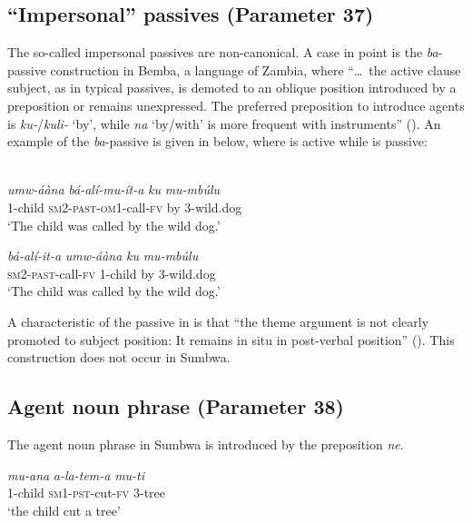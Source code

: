 \documentclass[output=paper		  ]{langscibook}
\begin{document}
\subsection{``Impersonal'' passives (Parameter 37)}\label{sec:kahigi:4.2}

{The so-called impersonal passives are non-canonical. A case in point is the} {\textit{ba}}{{}-passive construction in Bemba, a language of Zambia, where ``\ldots\, the active clause subject, as in typical passives, is demoted to an oblique position introduced by a preposition or remains unexpressed. The preferred preposition to introduce agents is} {\textit{ku-}}{/}{\textit{kuli-} }{`by', while} {\textit{na} }{`by/with' is more frequent with instruments'' (\citealt[118]{KulaMarten2010}). An example of the}{ \textit{ba}}{{}-passive is given in  below, where    is active while  is passive:}

\ea\label{ex:kahigi:51} \citet[119]{KulaMarten2010}\\
    \ea\label{ex:kahigi:51a} \gll \textit{umw-áàna}      \textit{bá-alí-mu-ít-a}              \textit{ku}  \textit{mu-mbúlu}\\
    1-child        \textsc{sm2-past-om1-}call-\textsc{fv}   by  3-wild.dog\\
    \glt ‘The child was called by the wild dog.’

    \ex\label{ex:kahigi:51b} \gll \textit{bá-alí-it-a}             \textit{umw-áàna}      \textit{ku}    \textit{mu-mbúlu}\\
    \textsc{sm2-past-}call-\textsc{fv}  1-child        by    3-wild.dog\\
    \glt ‘The child was called by the wild dog.’
    \z
\z



{A characteristic of the passive in  is that “the theme argument is not clearly promoted to subject position: It remains in situ in post-verbal position” (\citealt[119]{KulaMarten2010}).} This construction does not occur in Sumbwa.

\subsection{Agent noun phrase (Parameter 38)}\label{sec:kahigi:4.3}

{The agent noun phrase in Sumbwa is introduced by the preposition} {\textit{ne}}.

\ea\label{ex:kahig:52}
    \ea\label{ex:kahigi:52a} \gll \textit{mu-ana}   \textit{a-la-tem-a}         \textit{mu-ti}\\
    1-child   \textsc{sm1-pst-}cut\textsc{-fv}  3-tree\\
    \glt ‘the child cut a tree’
\end{document}
